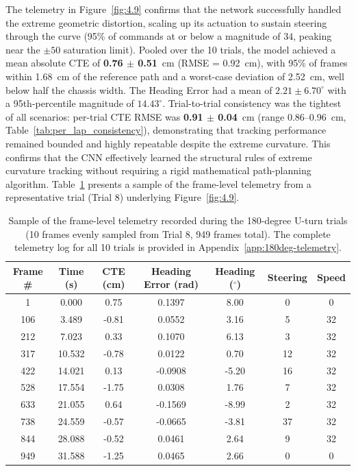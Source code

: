 The telemetry in Figure~\ref{fig:4.9} confirms that the network successfully handled the extreme geometric distortion, scaling up its actuation to sustain steering through the curve (95\% of commands at or below a magnitude of $34$, peaking near the $\pm 50$ saturation limit). Pooled over the 10 trials, the model achieved a mean absolute CTE of \textbf{0.76 $\pm$ 0.51}~cm (RMSE = 0.92~cm), with 95\% of frames within 1.68~cm of the reference path and a worst-case deviation of 2.52~cm, well below half the chassis width. The Heading Error had a mean of $2.21 \pm 6.70^\circ$ with a 95th-percentile magnitude of $14.43^\circ$. Trial-to-trial consistency was the tightest of all scenarios: per-trial CTE RMSE was \textbf{0.91 $\pm$ 0.04}~cm (range 0.86--0.96~cm, Table~\ref{tab:per_lap_consistency}), demonstrating that tracking performance remained bounded and highly repeatable despite the extreme curvature. This confirms that the CNN effectively learned the structural rules of extreme curvature tracking without requiring a rigid mathematical path-planning algorithm. Table~\ref{tab:180deg-telemetry-sample} presents a sample of the frame-level telemetry from a representative trial (Trial 8) underlying Figure~\ref{fig:4.9}.

\begin{table}[H]
	\centering
	\caption{Sample of the frame-level telemetry recorded during the 180-degree U-turn trials (10 frames evenly sampled from Trial 8, 949 frames total). The complete telemetry log for all 10 trials is provided in Appendix~\ref{app:180deg-telemetry}.}
	\label{tab:180deg-telemetry-sample}
	\begin{tabular}{c c c c c c c}
		\toprule
		Frame \# & Time (s) & CTE (cm) & Heading Error (rad) & Heading ($^{\circ}$) & Steering & Speed \\
		\midrule
		1   & 0.000  & 0.75  & 0.1397  & 8.00  & 0  & 0  \\
		106 & 3.489  & -0.81 & 0.0552  & 3.16  & 5  & 32 \\
		212 & 7.023  & 0.33  & 0.1070  & 6.13  & 3  & 32 \\
		317 & 10.532 & -0.78 & 0.0122  & 0.70  & 12 & 32 \\
		422 & 14.021 & 0.13  & -0.0908 & -5.20 & 16 & 32 \\
		528 & 17.554 & -1.75 & 0.0308  & 1.76  & 7  & 32 \\
		633 & 21.055 & 0.64  & -0.1569 & -8.99 & 2  & 32 \\
		738 & 24.559 & -0.57 & -0.0665 & -3.81 & 37 & 32 \\
		844 & 28.088 & -0.52 & 0.0461  & 2.64  & 9  & 32 \\
		949 & 31.588 & -1.25 & 0.0465  & 2.66  & 0  & 0  \\
		\bottomrule
	\end{tabular}
\end{table}

